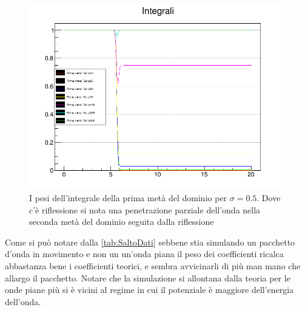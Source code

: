 \begin{figure}[htb]
  \centering
  \includegraphics[width=0.7\linewidth]{IMG/SaltoR}
  \caption{I pesi dell'integrale della prima met\`a del dominio per $\sigma=0.5$. Dove c'\`e riflessione si nota una penetrazione parziale dell'onda nella seconda met\`a del dominio seguita dalla riflessione}\label{fig:SaltoR}%
\end{figure}

Come si pu\`o notare dalla \autoref{tab:SaltoDati} sebbene stia simulando un pacchetto d'onda in movimento e non un un'onda piana il peso dei coefficienti ricalca abbastanza bene i coefficienti teorici, e sembra avvicinarli di pi\`u man mano che allargo il pacchetto. Notare che la simulazione si allontana dalla teoria per le onde piane pi\`u si \`e vicini al regime in cui il potenziale \`e maggiore dell'energia dell'onda.

